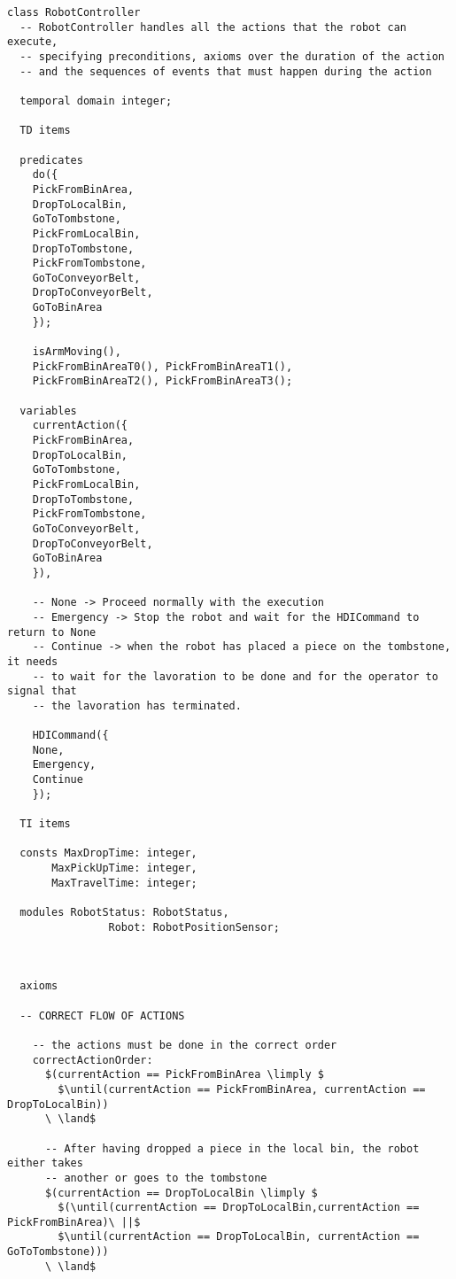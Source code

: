 \begin{lstlisting}[fontadjust, mathescape, frame=single]
class RobotController
  -- RobotController handles all the actions that the robot can execute, 
  -- specifying preconditions, axioms over the duration of the action
  -- and the sequences of events that must happen during the action

  temporal domain integer;

  TD items

  predicates
    do({
    PickFromBinArea,
    DropToLocalBin,
    GoToTombstone,
    PickFromLocalBin,
    DropToTombstone,
    PickFromTombstone,
    GoToConveyorBelt,
    DropToConveyorBelt,
    GoToBinArea
    });

    isArmMoving(),
    PickFromBinAreaT0(), PickFromBinAreaT1(),
    PickFromBinAreaT2(), PickFromBinAreaT3();

  variables
    currentAction({
    PickFromBinArea,
    DropToLocalBin,
    GoToTombstone,
    PickFromLocalBin,
    DropToTombstone,
    PickFromTombstone,
    GoToConveyorBelt,
    DropToConveyorBelt,
    GoToBinArea
    }),

    -- None -> Proceed normally with the execution
    -- Emergency -> Stop the robot and wait for the HDICommand to return to None
    -- Continue -> when the robot has placed a piece on the tombstone, it needs 
    -- to wait for the lavoration to be done and for the operator to signal that 
    -- the lavoration has terminated.

    HDICommand({
    None,
    Emergency,
    Continue
    });
    
  TI items 
  
  consts MaxDropTime: integer,
       MaxPickUpTime: integer,
       MaxTravelTime: integer;

  modules RobotStatus: RobotStatus,
                Robot: RobotPositionSensor;

  
  
  axioms

  -- CORRECT FLOW OF ACTIONS

    -- the actions must be done in the correct order
    correctActionOrder:
      $(currentAction == PickFromBinArea \limply $
        $\until(currentAction == PickFromBinArea, currentAction == DropToLocalBin))
      \ \land$

      -- After having dropped a piece in the local bin, the robot either takes 
      -- another or goes to the tombstone
      $(currentAction == DropToLocalBin \limply $
        $(\until(currentAction == DropToLocalBin,currentAction == PickFromBinArea)\ ||$
        $\until(currentAction == DropToLocalBin, currentAction == GoToTombstone)))
      \ \land$


\end{lstlisting}
